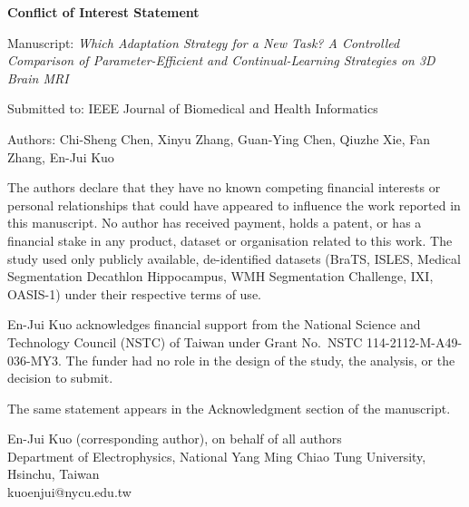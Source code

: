 \documentclass[11pt]{article}
\begin{document}
\noindent\textbf{Conflict of Interest Statement}

\noindent Manuscript: \emph{Which Adaptation Strategy for a New Task? A Controlled Comparison of Parameter-Efficient and Continual-Learning Strategies on 3D Brain MRI}

\noindent Submitted to: IEEE Journal of Biomedical and Health Informatics

\noindent Authors: Chi-Sheng Chen, Xinyu Zhang, Guan-Ying Chen, Qiuzhe Xie, Fan Zhang, En-Jui Kuo

The authors declare that they have no known competing financial interests or personal relationships that could have appeared to influence the work reported in this manuscript. No author has received payment, holds a patent, or has a financial stake in any product, dataset or organisation related to this work. The study used only publicly available, de-identified datasets (BraTS, ISLES, Medical Segmentation Decathlon Hippocampus, WMH Segmentation Challenge, IXI, OASIS-1) under their respective terms of use.

En-Jui Kuo acknowledges financial support from the National Science and Technology Council (NSTC) of Taiwan under Grant No.\ NSTC 114-2112-M-A49-036-MY3. The funder had no role in the design of the study, the analysis, or the decision to submit.

The same statement appears in the Acknowledgment section of the manuscript.

\vspace{2em}
\noindent En-Jui Kuo (corresponding author), on behalf of all authors\\
Department of Electrophysics, National Yang Ming Chiao Tung University, Hsinchu, Taiwan\\
kuoenjui@nycu.edu.tw
\end{document}
